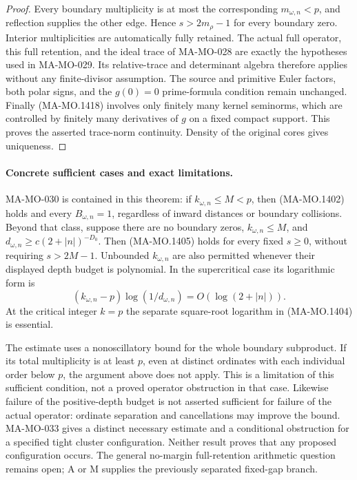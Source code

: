 \begin{proof}
Every boundary multiplicity is at most the corresponding
$m_{\omega,n}<p$, and reflection supplies the other edge.
Hence $s>2m_\rho-1$ for every boundary zero.  Interior
multiplicities are automatically fully retained.  The actual
full operator, this full retention, and the ideal trace of
MA-MO-028 are exactly the hypotheses used in MA-MO-029.
Its relative-trace and determinant algebra therefore applies
without any finite-divisor assumption.  The source and primitive
Euler factors, both polar signs, and the $g(0)=0$ prime-formula
condition remain unchanged.
Finally (MA-MO.1418) involves only finitely many kernel seminorms,
which are controlled by finitely many derivatives of $g$ on a
fixed compact support.  This proves the asserted trace-norm
continuity.  Density of the original cores gives uniqueness.
\end{proof}

\paragraph{Concrete sufficient cases and exact limitations.}
MA-MO-030 is contained in this theorem: if $k_{\omega,n}\le M<p$,
then (MA-MO.1402) holds and every $B_{\omega,n}=1$, regardless
of inward distances or boundary collisions.  Beyond that class,
suppose there are no boundary zeros, $k_{\omega,n}\le M$,
and $d_{\omega,n}\ge c(2+|n|)^{-D_0}$.  Then (MA-MO.1405)
holds for every fixed $s\ge0$, without requiring $s>2M-1$.
Unbounded $k_{\omega,n}$ are also permitted whenever their
displayed depth budget is polynomial.  In the supercritical
case its logarithmic form is
\[
       (k_{\omega,n}-p)\log(1/d_{\omega,n})=O(\log(2+|n|)).
 \tag{MA-MO.1423}
\]
At the critical integer $k=p$ the separate square-root logarithm
in (MA-MO.1404) is essential.

The estimate uses a nonoscillatory bound for the whole boundary
subproduct.  If its total multiplicity is at least $p$, even at
distinct ordinates with each individual order below $p$, the
argument above does not apply.  This is a limitation of this
sufficient condition, not a proved operator obstruction in that
case.  Likewise failure of the positive-depth budget is not
asserted sufficient for failure of the actual operator: ordinate
separation and cancellations may improve the bound.
MA-MO-033 gives a distinct necessary estimate and a conditional
obstruction for a specified tight cluster configuration.
Neither result proves that any proposed configuration occurs.
The general no-margin full-retention arithmetic question remains
open; A or M supplies the previously separated fixed-gap branch.

